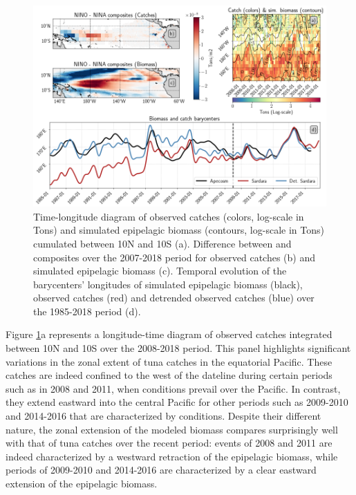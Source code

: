 \begin{figure}[h!tp]
	\centering
	\includegraphics[scale=0.4]{figs/plot_validation_apecosm.png}
	\caption{Time-longitude diagram of observed catches (colors, log-scale in Tons) and simulated epipelagic biomass (contours, log-scale in Tons) cumulated between 10\degree{}N and 10\degree{}S (a). Difference between \nino{} and \nina{} composites over the 2007-2018 period for observed catches (b) and simulated epipelagic biomass (c). Temporal evolution of the barycenters' longitudes of simulated epipelagic biomass (black), observed catches (red) and detrended observed catches (blue)  over the 1985-2018 period (d).}
	\label{fig:apecosm_validation}
\end{figure}


Figure \ref{fig:apecosm_validation}a represents a longitude-time diagram of observed catches integrated between 10\degree{}N and 10\degree{}S over the 2008-2018 period. This panel highlights significant variations in the zonal extent of tuna catches in the equatorial Pacific. These catches are indeed confined to the west of the dateline during certain periods such as in 2008 and 2011, when \nina{} conditions prevail over the Pacific. In contrast, they extend eastward into the central Pacific for other periods such as 2009-2010 and 2014-2016 that are characterized by \nino{} conditions. Despite their different nature, the zonal extension of the modeled biomass compares surprisingly well with that of tuna catches over the recent period: \nina{} events of 2008 and 2011 are indeed characterized by a westward retraction of the epipelagic biomass, while \nino{} periods of 2009-2010 and 2014-2016 are characterized by a clear eastward extension of the epipelagic biomass. 

